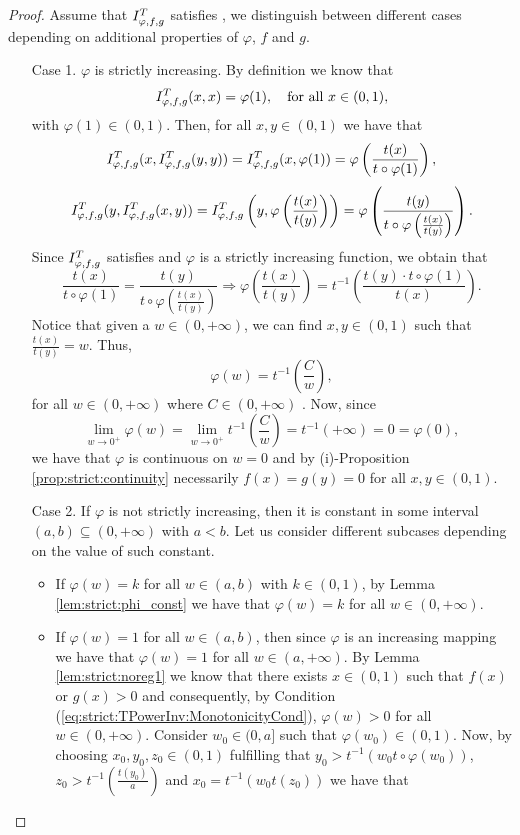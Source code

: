 \begin{proof}
	Assume that $I^T_{\varphi,f,g}$ satisfies \EP, we distinguish between different cases depending on additional properties of $\varphi$, $f$ and $g$.
	\begin{enumerate}
		\item[Case 1.] $\varphi$ is strictly increasing. By definition we know that
		$$I^T_{\varphi,f,g}(x,x)=\varphi(1), \quad \text{for all } x \in(0,1),$$
		with $\varphi(1) \in (0,1)$. Then, for all $x,y \in (0,1)$ we have that
		$$I^T_{\varphi,f,g}(x,I^T_{\varphi,f,g}(y,y)) =I^T_{\varphi,f,g}(x,\varphi(1)) = \varphi \left(\frac{t(x)}{t\circ \varphi(1)}\right),$$
		$$I^T_{\varphi,f,g}(y,I^T_{\varphi,f,g}(x,y)) =I^T_{\varphi,f,g}\left(y,\varphi\left(\frac{t(x)}{t(y)}\right)\right) = \varphi \left(\frac{t(y)}{t \circ \varphi \left(\frac{t(x)}{t(y)}\right)}\right).$$
		Since $I^T_{\varphi,f,g}$ satisfies \EP and $\varphi$ is a strictly increasing function, we obtain that
		$$ \frac{t(x)}{t\circ \varphi (1)} = \frac{t(y)}{t \circ \varphi \left(\frac{t(x)}{t(y)}\right)} \Rightarrow \varphi \left(\frac{t(x)}{t(y)}\right) = t^{-1}\left(\frac{t(y)\cdot t \circ \varphi (1)}{t(x)}\right).$$
		Notice that given a $w \in (0,+\infty)$, we can find $x,y \in (0,1)$ such that $\frac{t(x)}{t(y)}=w$. Thus,
		$$ \varphi(w)=t^{-1}\left(\frac{C}{w}\right),$$
		for all $w \in (0,+\infty)$ where $C \in (0,+\infty)$ . Now, since
		$$\lim_{w \to 0^+} \varphi (w) = \lim_{w \to 0^+} t^{-1}\left(\frac{C}{w}\right) =t^{-1}(+\infty)=0=\varphi(0),$$
		we have that $\varphi$ is continuous on $w=0$ and by (i)-Proposition \ref{prop:strict:continuity} necessarily $f(x)=g(y)=0$ for all $ x,y\in (0,1)$.
		\item[Case 2.] If $\varphi$ is not strictly increasing, then it is constant in some interval $(a,b) \subseteq (0,+\infty)$ with $a<b$. Let us consider different subcases depending on the value of such constant.
		\begin{itemize}
			\item If $\varphi(w)=k$ for all $w \in (a,b)$ with $k \in (0,1)$, by Lemma \ref{lem:strict:phi_const} we have that $\varphi(w)=k$ for all $w \in (0,+\infty)$.
			\item If $\varphi(w)=1$ for all $w \in (a,b)$, then since $\varphi$ is an increasing mapping we have that $\varphi(w)=1$ for all $w \in (a,+\infty)$. By Lemma \ref{lem:strict:noreg1} we know that there exists $x\in(0,1)$ such that $f(x)$ or $g(x)>0$ and consequently, by Condition (\ref{eq:strict:TPowerInv:MonotonicityCond}),  $\varphi(w)>0$ for all $w \in (0,+\infty)$. Consider $w_0 \in (0,a]$ such that $\varphi(w_0) \in (0,1)$. Now, by choosing $x_0,y_0,z_0 \in (0,1)$ fulfilling that $y_0 > t^{-1}(w_0t\circ \varphi(w_0))$, $z_0 > t^{-1}\left(\frac{t(y_0)}{a}\right)$ and $x_0=t^{-1}(w_0t(z_0))$ we have that

\end{itemize}
\end{enumerate}
\end{proof}
